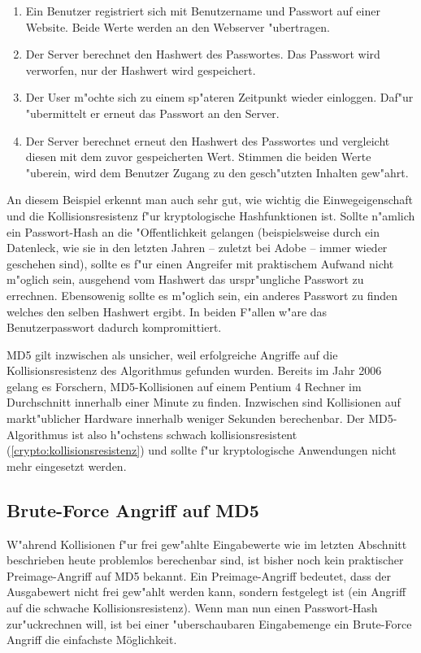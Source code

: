 \begin{refsection}
\begin{enumerate}
		\item Ein Benutzer registriert sich mit Benutzername und Passwort auf einer
			Website. Beide Werte werden an den Webserver "ubertragen.
		\item Der Server berechnet den Hashwert des Passwortes. Das Passwort wird
			verworfen, nur der Hashwert wird gespeichert.
		\item Der User m"ochte sich zu einem sp"ateren Zeitpunkt wieder einloggen.
			Daf"ur "ubermittelt er erneut das Passwort an den Server.
		\item Der Server berechnet erneut den Hashwert des Passwortes und
			vergleicht diesen mit dem zuvor gespeicherten Wert. Stimmen die beiden
			Werte "uberein, wird dem Benutzer Zugang zu den gesch"utzten Inhalten
			gew"ahrt.
\end{enumerate}

An diesem Beispiel erkennt man auch sehr gut, wie wichtig die Einwegeigenschaft
und die Kollisionsresistenz f"ur kryptologische Hashfunktionen ist. Sollte
n"amlich ein Passwort-Hash an die "Offentlichkeit gelangen (beispielsweise durch
ein Datenleck, wie sie in den letzten Jahren -- zuletzt bei Adobe -- immer
wieder geschehen sind), sollte es f"ur einen Angreifer mit praktischem Aufwand
nicht m"oglich sein, ausgehend vom Hashwert das urspr"ungliche Passwort zu
errechnen. Ebensowenig sollte es m"oglich sein, ein anderes Passwort zu finden
welches den selben Hashwert ergibt. In beiden F"allen w"are das Benutzerpasswort
dadurch kompromittiert.

MD5 gilt inzwischen als unsicher, weil erfolgreiche Angriffe auf die
Kollisionsresistenz des Algorithmus gefunden wurden. Bereits im Jahr 2006 gelang
es Forschern, MD5-Kollisionen auf einem Pentium 4 Rechner im Durchschnitt
innerhalb einer Minute zu finden\cite{crypto:stevens2006fast}. Inzwischen sind
Kollisionen auf markt"ublicher Hardware innerhalb weniger Sekunden berechenbar.
Der MD5-Algorithmus ist also h"ochstens schwach kollisionsresistent
(\ref{crypto:kollisionsresistenz}) und sollte f"ur kryptologische Anwendungen
nicht mehr eingesetzt werden.

\subsection{Brute-Force Angriff auf MD5}

W"ahrend Kollisionen f"ur frei gew"ahlte Eingabewerte wie im letzten Abschnitt
beschrieben heute problemlos berechenbar sind, ist bisher noch kein praktischer
Preimage-Angriff auf MD5 bekannt. Ein Preimage-Angriff bedeutet, dass der
Ausgabewert nicht frei gew"ahlt werden kann, sondern festgelegt ist (ein Angriff
auf die schwache Kollisionsresistenz). Wenn man nun einen Passwort-Hash
zur"uckrechnen will, ist bei einer "uberschaubaren Eingabemenge ein Brute-Force
Angriff die einfachste Möglichkeit.


\end{refsection}
